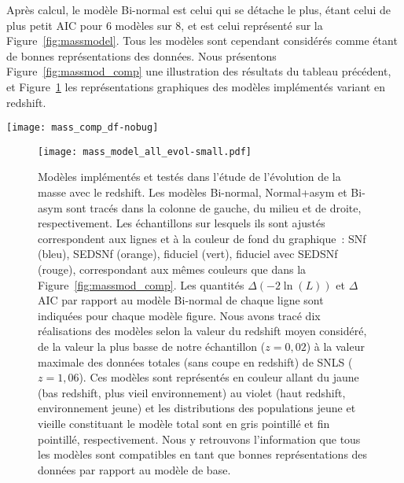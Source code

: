 \documentclass[../main/main.tex]{subfiles}
\begin{document}
Après calcul, le modèle Bi-normal est celui qui se détache le plus, étant celui de
plus petit AIC pour 6 modèles sur 8, et est celui représenté sur la
Figure~\ref{fig:massmodel}. Tous les modèles sont cependant considérés comme
étant de bonnes représentations des données. Nous présentons
Figure~\ref{fig:massmod_comp} une illustration des résultats du tableau
précédent, et Figure~\ref{fig:massmod_all} les représentations graphiques des
modèles implémentés variant en redshift.

\begin{SCfigure}[1][h!]
    \centering
    \texttt{[image: mass\_comp\_df-nobug]}
    \caption[$\Delta$AIC entre le modèle Bi-normal et les autres
    modèles]{$\Delta$AIC entre le modèle Bi-normal et les autres modèles (voir
        Tableau~\ref{tab:modelcomp}). Tous les modèles sont dérivants. Les
        marqueurs bleus, orange, verts et rouges montrent les résultats lorsque
        l'analyse est effectuée sur l'échantillon SNf, SEDSNf, fiduciel,
        fiduciel avec SEDSNf, respectivement (voir légende). Les bandes de
        couleur illustrent la validité des modèles, d'acceptable ($\Delta$AIC >
        -5) à exclu ($\Delta$AIC < -20). En suivant ces valeurs d'AIC, tous les
        modèles sont compatibles entre eux.}
    \label{fig:massmod_comp}
\end{SCfigure}

\begin{figure}[htbp]
    \vspace*{-3cm}
    \centerfloat
    \texttt{[image: mass\_model\_all\_evol-small.pdf]}
    \caption[Modèles implémentés et testés dans l'étude de l'évolution de
    l'étirement avec le redshift]{\scriptsize Modèles implémentés et testés dans
        l'étude de l'évolution de la masse avec le redshift. Les modèles
        Bi-normal, Normal+asym et Bi-asym sont tracés dans la colonne de gauche,
        du milieu et de droite, respectivement. Les échantillons sur lesquels
        ils sont ajustés correspondent aux lignes et à la couleur de fond du
        graphique~: SNf (bleu), SEDSNf (orange), fiduciel (vert), fiduciel avec
        SEDSNf (rouge), correspondant aux mêmes couleurs que dans la
        Figure~\ref{fig:massmod_comp}. Les quantités $\Delta(-2\ln(L))$ et
        $\Delta$AIC par rapport au modèle Bi-normal de chaque ligne sont
        indiquées pour chaque modèle figure. Nous avons tracé dix réalisations
        des modèles selon la valeur du redshift moyen considéré, de la valeur la
        plus basse de notre échantillon ($z = 0,02$) à la valeur maximale des
        données totales (sans coupe en redshift) de SNLS ($z = 1,06$). Ces
        modèles sont représentés en couleur allant du jaune (bas redshift, plus
        vieil environnement) au violet (haut redshift, environnement jeune) et
        les distributions des populations jeune et vieille constituant le modèle
        total sont en gris pointillé et fin pointillé, respectivement. Nous y
        retrouvons l'information que tous les modèles sont compatibles en tant
    que bonnes représentations des données par rapport au modèle de base.}
    \label{fig:massmod_all}
\end{figure}
\end{document}
